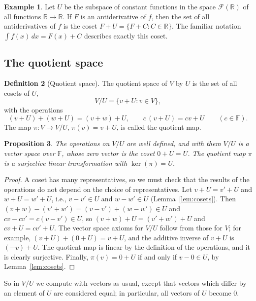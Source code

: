 \documentclass[11pt]{article}
\theoremstyle{definition}
\newtheorem{definition}{Definition}[section]
\newtheorem{example}[definition]{Example}
\theoremstyle{plain}
\newtheorem{proposition}[definition]{Proposition}
\theoremstyle{remark}
\begin{document}
\begin{example}
    Let $U$ be the subspace of constant functions in the space $\mathcal{F}(\mathbb{R})$ of all functions $\mathbb{R} \to \mathbb{R}$. If $F$ is an antiderivative of $f$, then the set of all antiderivatives of $f$ is the coset $F + U = \{F + C : C \in \mathbb{R}\}$. The familiar notation $\int f(x)\, dx = F(x) + C$ describes exactly this coset.
\end{example}

\subsection{The quotient space}

\begin{definition}[Quotient space]
    The quotient space of $V$ by $U$ is the set of all cosets of $U$,
    \[V/U = \{v + U : v \in V\},\]
    with the operations
    \[(v + U) + (w + U) = (v + w) + U, \qquad c\,(v + U) = cv + U \qquad (c \in \mathbb{F}).\]
    The map $\pi: V \to V/U$, $\pi(v) = v + U$, is called the quotient map.
\end{definition}

\begin{proposition}\label{prop:quotient}
    The operations on $V/U$ are well defined, and with them $V/U$ is a vector space over $\mathbb{F}$, whose zero vector is the coset $0 + U = U$. The quotient map $\pi$ is a surjective linear transformation with $\ker(\pi) = U$.
\end{proposition}

\begin{proof}
    A coset has many representatives, so we must check that the results of the operations do not depend on the choice of representatives. Let $v + U = v' + U$ and $w + U = w' + U$, i.e., $v - v' \in U$ and $w - w' \in U$ (Lemma~\ref{lem:cosets}). Then $(v + w) - (v' + w') = (v - v') + (w - w') \in U$ and $cv - cv' = c(v - v') \in U$, so $(v + w) + U = (v' + w') + U$ and $cv + U = cv' + U$. The vector space axioms for $V/U$ follow from those for $V$; for example, $(v + U) + (0 + U) = v + U$, and the additive inverse of $v + U$ is $(-v) + U$. The quotient map is linear by the definition of the operations, and it is clearly surjective. Finally, $\pi(v) = 0 + U$ if and only if $v - 0 \in U$, by Lemma~\ref{lem:cosets}.
\end{proof}

So in $V/U$ we compute with vectors as usual, except that vectors which differ by an element of $U$ are considered equal; in particular, all vectors of $U$ become $0$.
\end{document}
